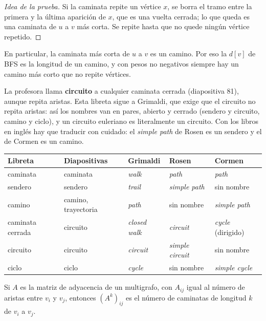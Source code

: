 \documentclass[11pt,letterpaper]{article}
\begin{document}
\begin{proof}[Idea de la prueba]
  Si la caminata repite un vértice $x$, se borra el tramo entre la
  primera y la última aparición de $x$, que es una vuelta cerrada; lo
  que queda es una caminata de $u$ a $v$ más corta. Se repite hasta
  que no quede ningún vértice repetido.
\end{proof}

En particular, la caminata más corta de $u$ a $v$ es un camino. Por
eso la $d[v]$ de BFS es la longitud de un camino, y con pesos no
negativos siempre hay un camino más corto que no repite vértices.

\begin{ojo}
  La profesora llama \textbf{circuito} a cualquier caminata cerrada
  (diapositiva 81), aunque repita aristas. Esta libreta sigue a
  Grimaldi, que exige que el circuito no repita aristas: así los
  nombres van en pares, abierto y cerrado (sendero y circuito, camino
  y ciclo), y un circuito euleriano es literalmente un circuito. Con
  los libros en inglés hay que traducir con cuidado: el
  \textit{simple path} de Rosen es un sendero y el de Cormen es un
  camino.\par
  \vspace{6pt}
  {\centering\small
  \begin{tabular}{lllll}
    \toprule
    \textbf{Libreta} & \textbf{Diapositivas} & \textbf{Grimaldi}
      & \textbf{Rosen} & \textbf{Cormen} \\
    \midrule
    caminata & caminata & \textit{walk} & \textit{path}
      & \textit{path} \\
    sendero & sendero & \textit{trail} & \textit{simple path}
      & sin nombre \\
    camino & camino, trayectoria & \textit{path} & sin nombre
      & \textit{simple path} \\
    caminata cerrada & circuito & \textit{closed walk}
      & \textit{circuit} & \textit{cycle} (dirigido) \\
    circuito & circuito & \textit{circuit} & \textit{simple circuit}
      & sin nombre \\
    ciclo & ciclo & \textit{cycle} & sin nombre
      & \textit{simple cycle} \\
    \bottomrule
  \end{tabular}\par}
\end{ojo}

\begin{proposicion}
  \label{prop:potencias-adyacencia}
  Si $A$ es la matriz de adyacencia de un multigrafo, con $A_{ij}$
  igual al número de aristas entre $v_i$ y $v_j$, entonces
  $(A^{k})_{ij}$ es el número de caminatas de longitud $k$ de $v_i$ a
  $v_j$.
\end{proposicion}
\end{document}
